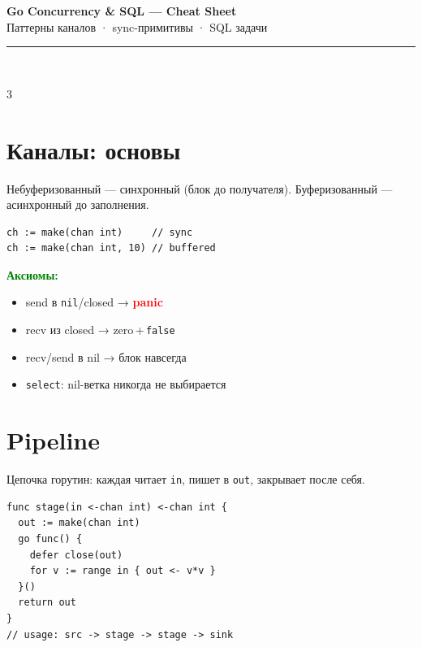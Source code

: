 \documentclass[8.5pt,a4paper]{article}
\newenvironment{clist}{%
  \begin{itemize}[leftmargin=9pt,itemsep=0pt,topsep=0.5pt,parsep=0pt,
    label=\textcolor{muted}{\fontsize{5}{5}\textbullet}]
    \setlength{\itemsep}{0pt}
}{\end{itemize}}
\newcommand{\hl}[2]{\textbf{\textcolor{#1}{#2}}}
\begin{document}
\pagestyle{empty}
\enlargethispage{12mm}

{\centering
  {\fontsize{12.5}{15}\bfseries\color{blue} Go Concurrency \& SQL — Cheat Sheet}\\[-1pt]
  {\fontsize{7}{8.5}\color{muted} Паттерны каналов · sync-примитивы · SQL задачи}\\[1pt]
  \textcolor{border}{\rule{\linewidth}{0.5pt}}\\[1.5pt]
}

\begin{multicols}{3}
\setlength{\columnsep}{5mm}

\section{Каналы: основы}

{\fontsize{7}{8.5} Небуферизованный — синхронный (блок до получателя). Буферизованный — асинхронный до заполнения.}
\begin{lstlisting}
ch := make(chan int)     // sync
ch := make(chan int, 10) // buffered
\end{lstlisting}

\hl{green}{Аксиомы:}
\begin{clist}
  \item send в \texttt{nil}/closed → \hl{red}{panic}
  \item recv из closed → zero\,+\,\texttt{false}
  \item recv/send в nil → блок навсегда
  \item \texttt{select}: nil-ветка никогда не выбирается
\end{clist}

\section{Pipeline}

{\fontsize{7}{8.5} Цепочка горутин: каждая читает \texttt{in}, пишет в \texttt{out}, закрывает после себя.}
\begin{lstlisting}
func stage(in <-chan int) <-chan int {
  out := make(chan int)
  go func() {
    defer close(out)
    for v := range in { out <- v*v }
  }()
  return out
}
// usage: src -> stage -> stage -> sink
\end{lstlisting}


\end{multicols}
\end{document}
